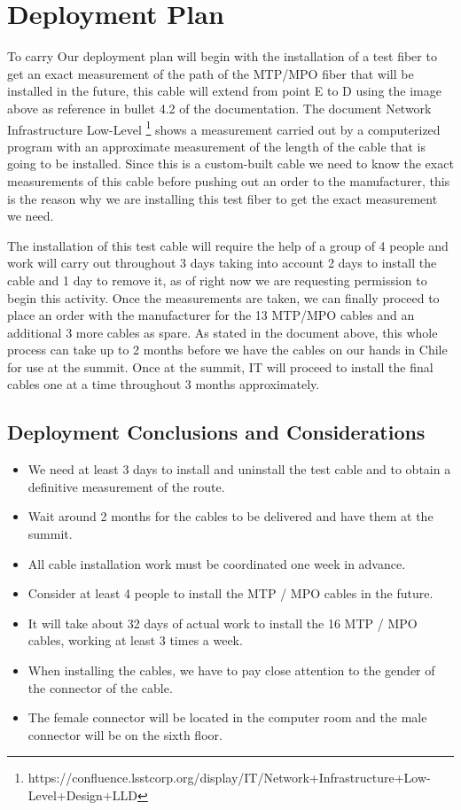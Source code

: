 \newpage

\section{Deployment Plan}

  To carry Our deployment plan will begin with the installation of a test fiber to get an exact measurement of the path of the MTP/MPO fiber that will be installed in the future, this cable will extend from point E to D using the image above as reference in bullet 4.2 of the documentation. The document Network Infrastructure Low-Level \footnote[1]{https://confluence.lsstcorp.org/display/IT/Network+Infrastructure+Low-Level+Design+LLD} shows a measurement carried out by a computerized program with an approximate measurement of the length of the cable that is going to be installed. Since this is a custom-built cable we need to know the exact measurements of this cable before pushing out an order to the manufacturer, this is the reason why we are installing this test fiber to get the exact measurement we need.

  The installation of this test cable will require the help of a group of 4 people and work will carry out throughout 3 days taking into account 2 days to install the cable and 1 day to remove it, as of right now we are requesting permission to begin this activity. Once the measurements are taken, we can finally proceed to place an order with the manufacturer for the 13 MTP/MPO cables and an additional 3 more cables as spare. As stated in the document above, this whole process can take up to 2 months before we have the cables on our hands in Chile for use at the summit. Once at the summit, IT will proceed to install the final cables one at a time throughout 3 months approximately.

\newpage

\subsection{Deployment Conclusions and Considerations}

  \begin{itemize}
      \item We need at least 3 days to install and uninstall the test cable and to obtain a definitive measurement of the route.
      \item Wait around 2 months for the cables to be delivered and have them at the summit.
      \item All cable installation work must be coordinated one week in advance.
      \item Consider at least 4 people to install the MTP / MPO cables in the future.
      \item It will take about 32 days of actual work to install the 16 MTP / MPO cables, working at least 3 times a week.
      \item When installing the cables, we have to pay close attention to the gender of the connector of the cable.
      \item The female connector will be located in the computer room and the male connector will be on the sixth floor.
  \end{itemize}

\newpage








